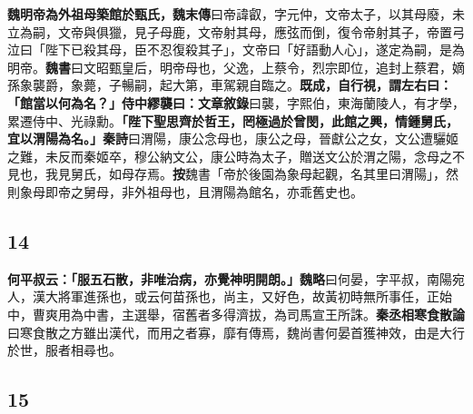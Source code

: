 \textbf{魏明帝為外祖母築館於甄氏，}{\footnotesize \textbf{魏末傳}曰帝諱叡，字元仲，文帝太子，以其母廢，未立為嗣，文帝與俱獵，見子母鹿，文帝射其母，應弦而倒，復令帝射其子，帝置弓泣曰「陛下已殺其母，臣不忍復殺其子」，文帝曰「好語動人心」，遂定為嗣，是為明帝。\textbf{魏書}曰文昭甄皇后，明帝母也，父逸，上蔡令，烈宗即位，追封上蔡君，嫡孫象襲爵，象薨，子暢嗣，起大第，車駕親自臨之。}\textbf{既成，自行視，謂左右曰：「館當以何為名？」侍中繆襲曰：}{\footnotesize \textbf{文章敘錄}曰襲，字熙伯，東海蘭陵人，有才學，累遷侍中、光祿勳。}\textbf{「陛下聖思齊於哲王，罔極過於曾閔，此館之興，情鍾舅氏，宜以渭陽為名。」}{\footnotesize \textbf{秦詩}曰渭陽，康公念母也，康公之母，晉獻公之女，文公遭驪姬之難，未反而秦姬卒，穆公納文公，康公時為太子，贈送文公於渭之陽，念母之不見也，我見舅氏，如母存焉。\textbf{按}魏書「帝於後園為象母起觀，名其里曰渭陽」，然則象母即帝之舅母，非外祖母也，且渭陽為館名，亦乖舊史也。}

\subsection*{14}

\textbf{何平叔云：「服五石散，非唯治病，亦覺神明開朗。」}{\footnotesize \textbf{魏略}曰何晏，字平叔，南陽宛人，漢大將軍進孫也，或云何苗孫也，尚主，又好色，故黃初時無所事任，正始中，曹爽用為中書，主選舉，宿舊者多得濟拔，為司馬宣王所誅。\textbf{秦丞相寒食散論}曰寒食散之方雖出漢代，而用之者寡，靡有傳焉，魏尚書何晏首獲神效，由是大行於世，服者相尋也。}

\subsection*{15}

